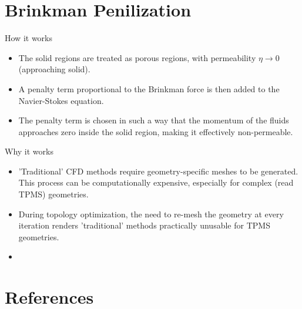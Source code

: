 \documentclass{beamer}
\begin{document}
	\section{Brinkman Penilization}
	\begin{frame}{How it works}



	\begin{itemize}
		\item The solid regions are treated as porous regions, with permeability $\eta\to 0$ (approaching solid).
		\item A penalty term proportional to the Brinkman force is then added to the Navier-Stokes equation. 
		\item The penalty term is chosen in such a way that the momentum of the fluids approaches zero inside the solid region, making it effectively non-permeable. 
	\end{itemize}
	\end{frame}
	\begin{frame}{Why it works}
		\begin{itemize}
			\item 'Traditional' CFD methods require geometry-specific meshes to be generated. This process can be computationally expensive, especially for complex (read TPMS) geometries. 
			\item During topology optimization, the need to re-mesh the geometry at every iteration renders 'traditional' methods practically unusable for TPMS geometries. 
			\item 
		\end{itemize}
	\end{frame}
	\section{References}
	
	\begin{frame}[allowframebreaks]
		
		

	\end{frame}
\end{document}
